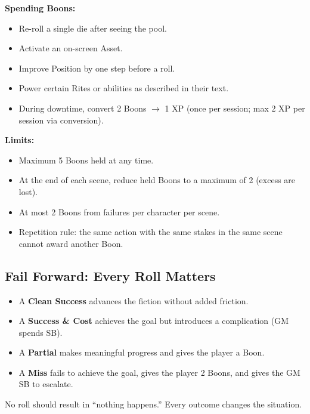 \textbf{Spending Boons:}
\begin{itemize}
  \item Re-roll a single die after seeing the pool.
  \item Activate an on-screen Asset.
  \item Improve Position by one step before a roll.
  \item Power certain Rites or abilities as described in their text.
  \item During downtime, convert 2 Boons $\rightarrow$ 1 XP (once per session; max 2 XP per session via conversion).
\end{itemize}

\textbf{Limits:}
\begin{itemize}
  \item Maximum 5 Boons held at any time.
  \item At the end of each scene, reduce held Boons to a maximum of 2 (excess are lost).
  \item At most 2 Boons from failures per character per scene.
  \item Repetition rule: the same action with the same stakes in the same scene cannot award another Boon.
\end{itemize}

\subsection{Fail Forward: Every Roll Matters}

\begin{itemize}
  \item A \textbf{Clean Success} advances the fiction without added friction.
  \item A \textbf{Success \& Cost} achieves the goal but introduces a complication (GM spends SB).
  \item A \textbf{Partial} makes meaningful progress and gives the player a Boon.
  \item A \textbf{Miss} fails to achieve the goal, gives the player 2 Boons, and gives the GM SB to escalate.
\end{itemize}

No roll should result in ``nothing happens.'' Every outcome changes the situation.

